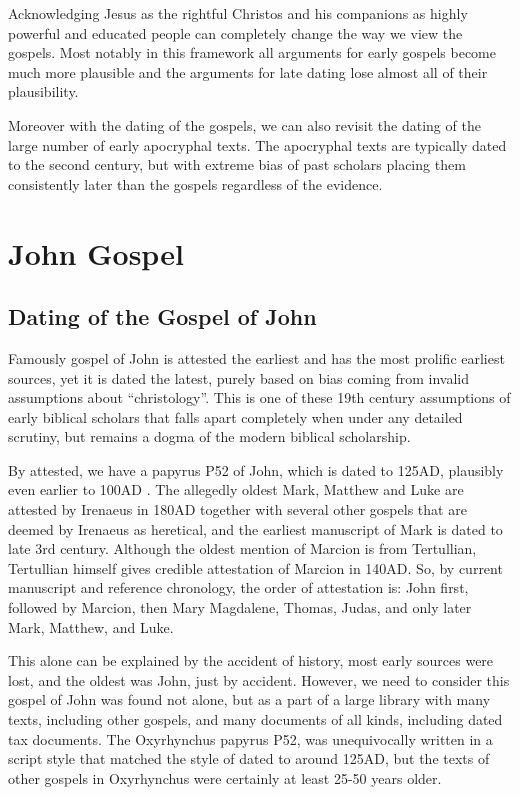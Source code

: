 Acknowledging Jesus as the rightful Christos and his companions as highly powerful and educated people can completely change the way we view the gospels.
Most notably in this framework all arguments for early gospels become much more plausible and the arguments for late dating lose almost all of their plausibility.

Moreover with the dating of the gospels, we can also revisit the dating of the large number of early apocryphal texts.
The apocryphal texts are typically dated to the second century, but with extreme bias of past scholars placing them consistently later than the gospels regardless of the evidence.

\section{John Gospel}\label{sec:john-gospel}

\subsection{Dating of the Gospel of John}\label{subsec:dating-of-the-gospel-of-john}

Famously gospel of John is attested the earliest and has the most prolific earliest sources, yet it is dated the latest, purely based on bias coming from invalid assumptions about ``christology''.
This is one of these 19th century assumptions of early biblical scholars that falls apart completely when under any detailed scrutiny, but remains a dogma of the modern biblical scholarship.

By attested, we have a papyrus P52 of John, which is dated to 125AD, plausibly even earlier to 100AD .
The allegedly oldest Mark, Matthew and Luke are attested by Irenaeus in 180AD together with several other gospels that are deemed by Irenaeus as heretical, and the earliest manuscript of Mark is dated to late 3rd century.
Although the oldest mention of Marcion is from Tertullian, Tertullian himself gives credible attestation of Marcion in 140AD.
So, by current manuscript and reference chronology, the order of attestation is: John first, followed by Marcion, then Mary Magdalene, Thomas, Judas, and only later Mark, Matthew, and Luke.

This alone can be explained by the accident of history, most early sources were lost, and the oldest was John, just by accident.
However, we need to consider this gospel of John was found not alone, but as a part of a large library with many texts, including other gospels, and many documents of all kinds, including dated tax documents.
The Oxyrhynchus papyrus P52, was unequivocally written in a script style that matched the style of dated to around 125AD, but the texts of other gospels in Oxyrhynchus were certainly at least 25-50 years older.


